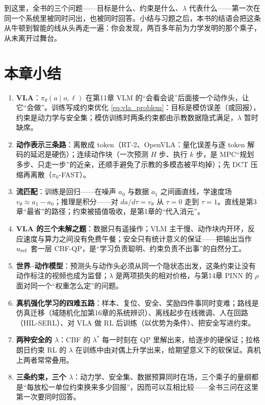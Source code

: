 到这里，全书的三个问题——目标是什么、约束是什么、$\lambda$ 代表什么——第一次在同一个系统里被同时问出，也被同时回答。小结与习题之后，本书的结语会把这条从牛顿到智能的线从头再走一遍：你会发现，两百多年前为力学发明的那个乘子，从未离开过舞台。


\section{本章小结}

\begin{enumerate}
    \item \textbf{VLA}：$\pi_\theta(a \mid o, \ell)$ 在第11章 VLM 的“会看会说”后面接一个动作头，让它“会做”。训练写成约束优化 \eqref{eq:vla_problem}：目标是模仿误差（或回报），约束是动力学与安全集；模仿训练时两条约束都由示教数据隐式满足，$\lambda$ 暂时缺席。
    \item \textbf{动作表示三条路}：离散成 token（RT-2、OpenVLA：量化误差与逐 token 解码的延迟是硬伤）；连续动作块（一次预测 $H$ 步、执行 $k$ 步，是 MPC“规划多步、只走一步”的近亲，还顺手避免了示教的多模态被平均掉）；先 DCT 压缩再离散（$\pi_0$-FAST）。
    \item \textbf{流匹配}：训练是回归——在噪声 $a_0$ 与数据 $a_1$ 之间画直线，学速度场 $v_\theta \approx a_1 - a_0$；推理是积分——对 $da/d\tau = v_\theta$ 从 $\tau = 0$ 走到 $\tau = 1$。直线是第3章“最省”的路径；约束被插值吸收，是第1章的“代入消元”。
    \item \textbf{VLA 的三个未解之题}：数据只有遥操作；VLM 主干慢、动作块内开环，反应速度与算力之间没有免费午餐；安全只有统计意义的保证——把输出当作 $u_{\rm ref}$ 套一层 CBF-QP，是“学习负责聪明、约束负责不出事”的自然分工。
    \item \textbf{世界--动作模型}：预测头与动作头必须从同一个隐状态出发，这条约束让没有动作标注的视频也成为监督；$\lambda$ 是两项损失的相对价格，与第14章 PINN 的 $\rho$ 面对同一个“权重怎么定”的问题。
    \item \textbf{真机强化学习的四难五路}：样本、复位、安全、奖励四件事同时变难；路线是仿真迁移（域随机化加第16章的系统辨识）、离线起步在线微调、人在回路（HIL-SERL）、对 VLA 做 RL 后训练（以优势为条件）、把安全写进约束。
    \item \textbf{两种安全的 $\lambda$}：CBF 的 $\lambda^*$ 每一时刻在 QP 里解出来，给逐步的硬保证；拉格朗日约束 RL 的 $\lambda$ 在训练中由对偶上升学出来，给期望意义下的软保证。真机上两者常常叠用。
    \item \textbf{三条约束，三个 $\lambda$}：动力学、安全集、数据预算同时在场，三个乘子的量纲都是“每放松一单位约束换来多少回报”，因而可以互相比较——全书三问在这里第一次要同时回答。
\end{enumerate}

